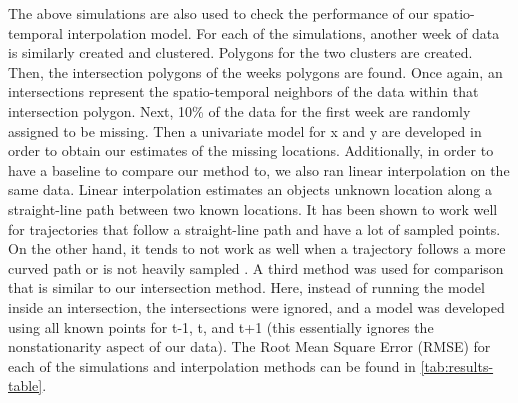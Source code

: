 \documentclass[12pt]{article}
\begin{document}
The above simulations are also used to check the performance of our
spatio-temporal interpolation model. For each of the simulations,
another week of data is similarly created and clustered. Polygons for
the two clusters are created. Then, the intersection polygons of the
weeks polygons are found. Once again, an intersections represent the
spatio-temporal neighbors of the data within that intersection polygon.
Next, 10\% of the data for the first week are randomly assigned to be
missing. Then a univariate model for x and y are developed in order to
obtain our estimates of the missing locations. Additionally, in order to
have a baseline to compare our method to, we also ran linear
interpolation on the same data. Linear interpolation estimates an
objects unknown location along a straight-line path between two known
locations. It has been shown to work well for trajectories that follow a
straight-line path and have a lot of sampled points. On the other hand,
it tends to not work as well when a trajectory follows a more curved
path or is not heavily sampled
\citep{wentz_comparison_2003, guo_improved_2021}. A third method was
used for comparison that is similar to our intersection method. Here,
instead of running the model inside an intersection, the intersections
were ignored, and a model was developed using all known points for t-1,
t, and t+1 (this essentially ignores the nonstationarity aspect of our
data). The Root Mean Square Error (RMSE) for each of the simulations and
interpolation methods can be found in \cref{tab:results-table}.
\end{document}
